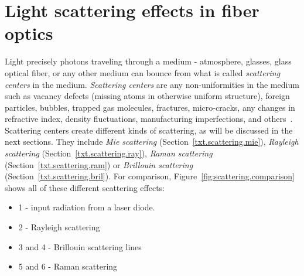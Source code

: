 



\section{Light scattering effects in fiber optics}\label{txt.scattering}

Light precisely photons traveling through a medium - atmosphere, glasses, glass optical fiber, or any other medium can bounce from what is called \textit{scattering centers} in the medium. \textit{Scattering centers} are any non-uniformities in the medium such as vacancy defects (missing atoms in otherwise uniform structure), foreign particles, bubbles, trapped gas molecules, fractures, micro-cracks, any changes in refractive index, density fluctuations, manufacturing imperfections, and others~\cite{scatteringcenterbook}. Scattering centers create different kinds of scattering, as will be discussed in the next sections. They include \textit{Mie scattering} (Section~\ref{txt.scattering.mie}), \textit{Rayleigh scattering} (Section~\ref{txt.scattering.ray}), \textit{Raman scattering} (Section~\ref{txt.scattering.ram}) or \textit{Brillouin scattering} (Section~\ref{txt.scattering.bril}). For comparison, Figure~\ref{fig:scattering.comparison} shows all of these different scattering effects:

\begin{itemize}
    \item 1 - input radiation from a laser diode.
    \item 2 - Rayleigh scattering 
    \item 3 and 4 - Brillouin scattering lines %
    \item 5 and 6 - Raman scattering 
\end{itemize}

